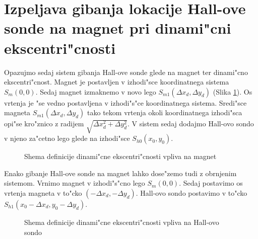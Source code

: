 \section{Izpeljava gibanja lokacije Hall-ove sonde na magnet pri dinami"cni ekscentri"cnosti}

Opazujmo sedaj sistem gibanja Hall-ove sonde glede na magnet ter dinami"cno ekscentri"cnost. Magnet je
 postavljen v izhodi"sce koordinatnega sistema $S_m(0,0)$. Sedaj magnet izmaknemo v novo lego $S_{m1}(\Delta
  x_d,\Delta y_d)$ (Slika \ref{fig:def_din_eks}). Os vrtenja je "se vedno postavljena v izhodi"s"ce
   koordinatnega sistema. Sredi"sce magneta $S_{m1}(\Delta x_d,\Delta y_d)$ tako tekom vrtenja okoli
    koordinatnega izhodi"sca opi"se kro"znico z radijem $\sqrt{\Delta x_d^2+\Delta y_d^2}$. V sistem sedaj
     dodajmo Hall-ovo sondo v njeno za"cetno lego glede na izhodi"sce $S_{h0}(x_0,y_0)$.




\begin{figure}[h!]
	\centering
	\caption{Shema definicije dinami"cne ekscentri"cnosti vpliva na magnet}
	\label{fig:def_din_eks}
\end{figure}




Enako gibanje Hall-ove sonde na magnet lahko dose"zemo tudi z obrnjenim sistemom. Vrnimo magnet v izhodi"s"cno lego $S_m(0,0)$. Sedaj postavimo os vrtenja magneta v to"cko $(-\Delta x_d,-\Delta y_d)$. Hall-ovo sondo postavimo v to"cko $S_{h1}(x_0-\Delta x_d,y_0 - \Delta y_d).$



\begin{figure}[h!]
	\centering
	\caption{Shema definicije dinami"cne ekscentri"cnosti vpliva na Hall-ovo sondo}
	\label{fig:def_din_eks_na_stator}
\end{figure}


